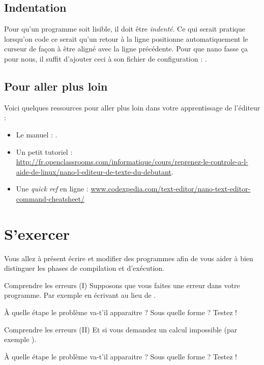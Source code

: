 \documentclass[a4paper,11pt]{style-esi/td}
\begin{document}
	\subsection{Indentation}
				 
		Pour qu'un programme soit lisible, 
		il doit être \textit{indenté}. 
		Ce qui serait pratique lorsqu'on code ce serait qu'un retour à la ligne 
		positionne automatiquement le curseur de façon à être aligné avec la ligne précédente. 
		Pour que nano fasse ça pour nous, 
		il suffit d'ajouter	ceci à son fichier de configuration : .
			
	\subsection{Pour aller plus loin} 
		
		Voici quelques ressources pour aller plus loin dans votre apprentissage de l'éditeur :
		\begin{itemize}
		\item Le manuel : .
		\item Un petit tutoriel : 
			\\{\tiny\url{http://fr.openclassrooms.com/informatique/cours/reprenez-le-controle-a-l-aide-de-linux/nano-l-editeur-de-texte-du-debutant}}.
		\item Une \textit{quick ref} en ligne : 
		\url{www.codexpedia.com/text-editor/nano-text-editor-command-cheatsheet/}
		\end{itemize}	

\section{S'exercer}  

	Vous allez à présent écrire et modifier des programmes
	afin de vous aider à bien distinguer les phases de compilation et d'exécution. 

	\begin{Exercice}{Comprendre les erreurs (I)}
		Supposons que vous faites une erreur dans votre programme.
		Par exemple en écrivant  
		au lieu de .

		À quelle étape le problème va-t'il apparaitre ?
		Sous quelle forme ? Testez !
	\end{Exercice}

	\begin{Exercice}{Comprendre les erreurs (II)}
		Et si vous demandez un calcul impossible (par exemple ).

		À quelle étape le problème va-t'il apparaitre ?
		Sous quelle forme ? Testez !
	\end{Exercice}
\end{document}
